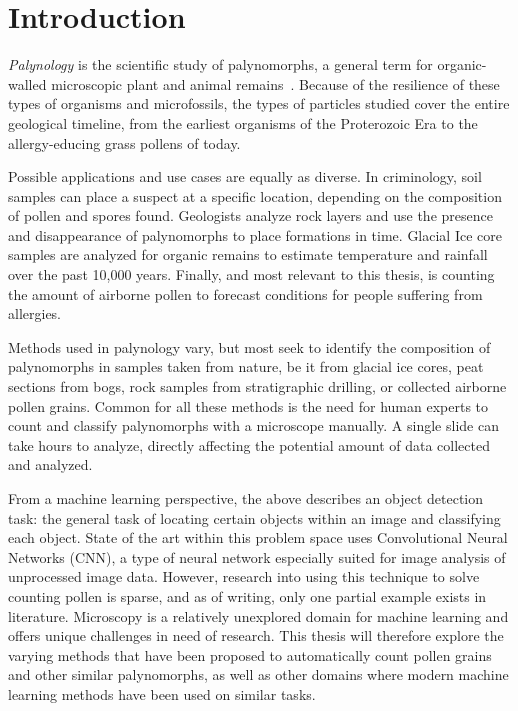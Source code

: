 \chapter{Introduction}\label{cha:Introduction}
\textit{Palynology} is the scientific study of palynomorphs, a general term for organic-walled microscopic plant and animal remains\ \parencite{askin_palynology_2003}.
Because of the resilience of these types of organisms and microfossils, the types of particles studied cover the entire geological timeline, from the earliest organisms of the Proterozoic Era to the allergy-educing grass pollens of today.

Possible applications and use cases are equally as diverse.
In criminology, soil samples can place a suspect at a specific location, depending on the composition of pollen and spores found.
Geologists analyze rock layers and use the presence and disappearance of palynomorphs to place formations in time.
Glacial Ice core samples are analyzed for organic remains to estimate temperature and rainfall over the past 10,000 years.
Finally, and most relevant to this thesis, is counting the amount of airborne pollen to forecast conditions for people suffering from allergies.

Methods used in palynology vary, but most seek to identify the composition of palynomorphs in samples taken from nature, be it from glacial ice cores, peat sections from bogs, rock samples from stratigraphic drilling, or collected airborne pollen grains.
Common for all these methods is the need for human experts to count and classify palynomorphs with a microscope manually.
A single slide can take hours to analyze, directly affecting the potential amount of data collected and analyzed.

From a machine learning perspective, the above describes an object detection task: the general task of locating certain objects within an image and classifying each object.
State of the art within this problem space uses Convolutional Neural Networks (CNN), a type of neural network especially suited for image analysis of unprocessed image data.
However, research into using this technique to solve counting pollen is sparse, and as of writing, only one partial example exists in literature.
Microscopy is a relatively unexplored domain for machine learning and offers unique challenges in need of research.
This thesis will therefore explore the varying methods that have been proposed to automatically count pollen grains and other similar palynomorphs, as well as other domains where modern machine learning methods have been used on similar tasks.

